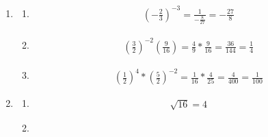 \documentclass{article}
\begin{document}
\begin{enumerate}
	      \begin{enumerate}
		      \item
		            \begin{align*}
			            \left(\frac{5}{3}\right)^0*2^{-1}
			             = 1*\frac{1}{2}
			             = 0.5
		            \end{align*}
		      \item
		            \begin{align*}
			            \frac{2^{-3}}{3^0}
			             = \frac{1}{8}
		            \end{align*}
		      \item
		            \begin{align*}
			            \left(\frac{1}{4}\right)^{-2}
			             = \frac{1}{1/16}
			             = 16
		            \end{align*}
	      \end{enumerate}
	\item
	      \begin{enumerate}
		      \item
		            \begin{align*}
			            \left(-\frac{2}{3}\right)^{-3}
			             = \frac{1}{-\frac{8}{27}}
			             = -\frac{27}{8}
		            \end{align*}
		      \item
		            \begin{align*}
			            \left(\frac{3}{2}\right)^{-2}\left(\frac{9}{16}\right)
			             = \frac{4}{9}*\frac{9}{16}
			             = \frac{36}{144}
			             = \frac{1}{4}
		            \end{align*}
		      \item
		            \begin{align*}
			            \left(\frac{1}{2}\right)^4*\left(\frac{5}{2}\right)^{-2}
			             = \frac{1}{16}*\frac{4}{25}
			             = \frac{4}{400} = \frac{1}{100}
		            \end{align*}
	      \end{enumerate}
	\item
	      \begin{enumerate}
		      \item
		            \begin{align*}
			            \sqrt{16}
			             = 4 
		            \end{align*}
		      \item
		            \begin{align*}

\end{align*}
\end{enumerate}
\end{enumerate}
\end{document}
